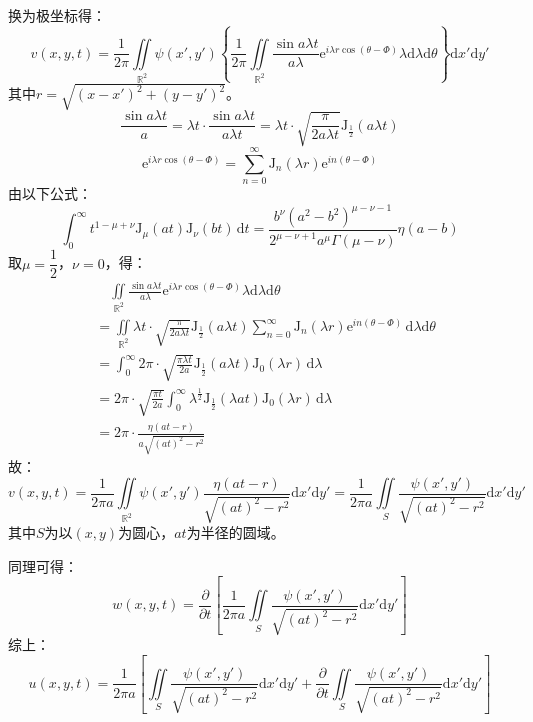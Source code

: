 \documentclass[a4paper,fontset=windows]{ctexart}
\begin{document}
\begin{itemize}
换为极坐标得：
\[
v(x,y,t) = \frac{1}{2\pi}\iint\limits_{\mathbb{R}^2}\psi(x',y')\left\{\frac{1}{2\pi}\iint\limits_{\mathbb{R}^2}\frac{\sin{a\lambda t}}{a\lambda}\mathrm{e}^{i\lambda r\cos(\theta-\varPhi)}\lambda\mathrm{d}\lambda\mathrm{d}\theta\right\}\mathrm{d}x'\mathrm{d}y'
\]
其中$r = \sqrt{(x-x')^2+(y-y')^2}$。
\[
\frac{\sin{a\lambda t}}{a} = \lambda t \cdot \frac{\sin{a\lambda t}}{a\lambda t} = \lambda t\cdot \sqrt{\frac{\pi}{2a\lambda t}}\mathrm{J}_{\frac{1}{2}}(a\lambda t)
\]
\[
\mathrm{e}^{i\lambda r\cos(\theta-\varPhi)} = \sum_{n=0}^{\infty}\mathrm{J}_{n}(\lambda r)\mathrm{e}^{in(\theta-\varPhi)}
\]
由以下公式：
\[
\int_{0}^{\infty}t^{1-\mu+\nu}\mathrm{J}_{\mu}(at)\mathrm{J}_{\nu}(bt)\,\mathrm{d}t = \frac{b^\nu(a^2-b^2)^{\mu-\nu-1}}{2^{\mu-\nu+1}a^{\mu}\Gamma(\mu-\nu)}\eta(a-b)
\]
取$\mu=\dfrac{1}{2}$，$\nu=0$，得：
\begin{align*}
&\quad \iint\limits_{\mathbb{R}^2}\frac{\sin{a\lambda t}}{a\lambda}\mathrm{e}^{i\lambda r\cos(\theta-\varPhi)}\lambda\mathrm{d}\lambda\mathrm{d}\theta \\
&= \iint\limits_{\mathbb{R}^2}\lambda t\cdot \sqrt{\frac{\pi}{2a\lambda t}}\mathrm{J}_{\frac{1}{2}}(a\lambda t)\sum_{n=0}^{\infty}\mathrm{J}_{n}(\lambda r)\mathrm{e}^{in(\theta-\varPhi)}\,\mathrm{d}\lambda\mathrm{d}\theta \\
&= \int_{0}^{\infty}2\pi\cdot \sqrt{\frac{\pi\lambda t}{2a}}\mathrm{J}_{\frac{1}{2}}(a\lambda t)\mathrm{J}_{0}(\lambda r)\,\mathrm{d}\lambda \\
&= 2\pi\cdot \sqrt{\frac{\pi t}{2a}}\int_{0}^{\infty}\lambda^{\frac{1}{2}}\mathrm{J}_{\frac{1}{2}}(\lambda at)\mathrm{J}_{0}(\lambda r)\,\mathrm{d}\lambda \\
&= 2\pi\cdot \frac{\eta(at-r)}{a\sqrt{(at)^2-r^2}}
\end{align*}
故：
\[
v(x,y,t) = \frac{1}{2\pi a}\iint\limits_{\mathbb{R}^2}\psi(x',y')\frac{\eta(at-r)}{\sqrt{(at)^2-r^2}}\mathrm{d}x'\mathrm{d}y' = \frac{1}{2\pi a}\iint\limits_{S}\frac{\psi(x',y')}{\sqrt{(at)^2-r^2}}\mathrm{d}x'\mathrm{d}y'
\]
其中$S$为以$(x,y)$为圆心，$at$为半径的圆域。

同理可得：
\[
w(x,y,t) = \frac{\partial}{\partial t}\left[\frac{1}{2\pi a}\iint\limits_{S}\frac{\psi(x',y')}{\sqrt{(at)^2-r^2}}\mathrm{d}x'\mathrm{d}y'\right]
\]
综上：
\[
u(x,y,t) = \frac{1}{2\pi a}\left[\iint\limits_{S}\frac{\psi(x',y')}{\sqrt{(at)^2-r^2}}\mathrm{d}x'\mathrm{d}y' + \frac{\partial}{\partial t}\iint\limits_{S}\frac{\psi(x',y')}{\sqrt{(at)^2-r^2}}\mathrm{d}x'\mathrm{d}y'\right]
\]

\end{itemize}
\end{document}

